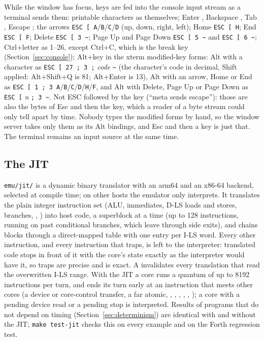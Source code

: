 While the window has focus, keys are fed into the console input stream as a terminal sends them:
printable characters as themselves; Enter , Backspace , Tab , Escape ;
the arrows \texttt{ESC [ A}/\texttt{B}/\texttt{C}/\texttt{D} (up, down, right, left); Home
\texttt{ESC [ H}; End \texttt{ESC [ F}; Delete \texttt{ESC [ 3 \textasciitilde}; Page Up and Page Down
\texttt{ESC [ 5 \textasciitilde} and \texttt{ESC [ 6 \textasciitilde}; Ctrl+letter as 1--26, except
Ctrl+C, which is the break key (Section~\ref{sec:console}); Alt+key in the xterm modified-key forms:
Alt with a character as \texttt{ESC [ 27 ; 3 ;} \textit{code} \texttt{\textasciitilde} (the character's
code in decimal, Shift applied: Alt+Shift+Q is 81; Alt+Enter is 13), Alt with an arrow, Home or End as
\texttt{ESC [ 1 ; 3 A}/\texttt{B}/\texttt{C}/\texttt{D}/\texttt{H}/\texttt{F}, and Alt with Delete,
Page Up or Page Down as \texttt{ESC [} \textit{n} \texttt{; 3 \textasciitilde}. Not ESC followed by the key
(``meta sends escape''): those are also the bytes of Esc and then the key, which a reader of a byte
stream could only tell apart by time. Nobody types the modified forms by hand, so the window server
takes only them as its Alt bindings, and Esc and then a key is just that.
The terminal remains an input source at the same time.

\subsection{The JIT}\label{sec:jit}

\texttt{emu/jit/} is a dynamic binary translator with an arm64 and an x86-64 backend, selected at
compile time; on other hosts the emulator only interprets. It translates the plain integer instruction
set (ALU, immediates, D-LS loads and stores, branches, , ) into host code, a
superblock at a time (up to 128 instructions, running on past conditional branches, which leave
through side exits), and chains blocks through a direct-mapped table with one entry per I-LS word.
Every other instruction, and every instruction that traps, is left to the interpreter: translated code
stops in front of it with the core's state exactly as the interpreter would have it, so traps are
precise and  is exact. A  invalidates every translation that read the
overwritten I-LS range. With the JIT a core runs a quantum of up to 8192 instructions per turn, and
ends its turn early at an instruction that meets other cores (a device or core-control transfer, a far
atomic, , , , , , ); a core
with a pending device read or a pending stop is interpreted. Results of programs that do not depend
on timing (Section~\ref{sec:determinism}) are identical with and without the JIT; \texttt{make
test-jit} checks this on every example and on the Forth regression test.


